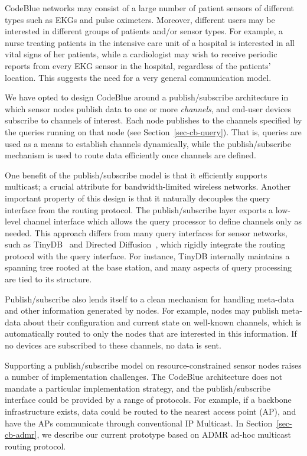 CodeBlue networks may consist of a large number of patient sensors of
different types such as EKGs and pulse oximeters. Moreover, different
users may be interested in different groups of patients and/or sensor
types. For example, a nurse treating patients in the intensive care
unit of a hospital is interested in all vital signs of her patients,
while a cardiologist may wish to receive periodic reports from every
EKG sensor in the hospital, regardless of the patients' location.
This suggests the need for a very general communication model.

We have opted to design CodeBlue around a publish/subscribe
architecture in which sensor nodes publish data to one or more {\em
channels}, and end-user devices subscribe to channels of interest.
Each node publishes to the channels specified by the queries running
on that node (see Section~\ref{sec-cb-query}).
That is, queries are used as a means to
establish channels dynamically, while the publish/subscribe
mechanism is used to route data efficiently once channels are defined.

One benefit of the publish/subscribe model is that it efficiently
supports multicast; a crucial attribute for bandwidth-limited
wireless networks. Another important property of this design is that
it naturally decouples the query interface from the routing protocol.
The publish/subscribe layer exports a low-level channel interface
which allows the query processor to define channels only as
needed. This approach differs from many query interfaces for sensor
networks, such as TinyDB~\cite{tinydb-osdi} and Directed
Diffusion~\cite{diffusion}, which rigidly integrate the routing
protocol with the query interface. For instance, TinyDB internally
maintains a spanning tree rooted at the base station, and many
aspects of query processing are tied to its structure.

Publish/subscribe also lends itself to a clean mechanism for handling
meta-data and other information generated by nodes. For example, nodes
may publish meta-data about their configuration and current state on
well-known channels, which is automatically routed to only the
nodes that are interested in this information. If no devices
are subscribed to these channels, no data is sent.

Supporting a publish/subscribe model on resource-constrained sensor
nodes raises a number of implementation challenges.  The CodeBlue
architecture does not mandate a particular implementation strategy,
and the publish/subscribe interface could be provided by a range of
protocols. For example, if a backbone infrastructure exists, data
could be routed to the nearest access point (AP), and have the APs
communicate through conventional IP Multicast. In
Section~\ref{sec-cb-admr}, we describe our current prototype based on ADMR
ad-hoc multicast routing protocol.


